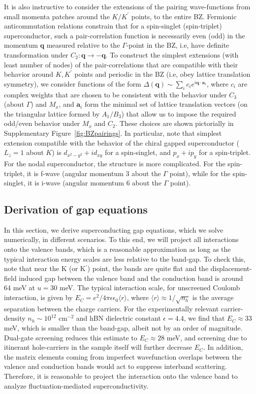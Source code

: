 \documentclass[aps,pra,twocolumn,superscriptaddress,10pt,article,nofootinbib,showpacs,longbibliography]{revtex4-1}
\def \q{{\mathbf q}}
\begin{document}
It is also instructive to consider the extensions of the pairing wave-functions from small momenta patches around the $K/K^\prime$ points, to the entire BZ.
Fermionic anticommutation relations constrain that for a spin-singlet (spin-triplet) superconductor, such a pair-correlation function is necessarily even (odd) in the momentum $\q$ measured relative to the $\Gamma$-point in the BZ, i.e, have definite transformation under $C_2: \q \to - \q$. 
To construct the simplest extensions (with least number of nodes) of the pair-correlations that are compatible with their behavior around $K,K^\prime$ points and periodic in the BZ (i.e, obey lattice translation symmetry), we consider functions of the form $\Delta(\q) \sim \sum_{i} c_i e^{i \q \cdot \mathbf{a}_i}$, where $c_i$ are complex weights that are chosen to be consistent with the behavior under $C_3$ (about $\Gamma$) and $M_x$, and $\mathbf{a}_i$ form the minimal set of lattice translation vectors (on the triangular lattice formed by $A_1/B_3$) that allow us to impose the required odd/even behavior under $M_x$ and $C_2$.
These choices are shown pictorially in Supplementary Figure~\ref{fig:BZpairings}.
In particular, note that simplest extension compatible with the behavior of the chiral gapped superconductor ($L_z = 1$ about $K$) is $d_{x^2 - y^2} + i d_{xy}$ for a spin-singlet, and $p_x + i p_y$ for a spin-triplet.
For the nodal superconductor, the structure is more complicated. 
For the spin-triplet, it is f-wave (angular momentum 3 about the $\Gamma $ point), while for the spin-singlet, it is i-wave (angular momentum 6 about the $\Gamma $ point).



\subsection{Derivation of gap equations}
In this section, we derive superconducting gap equations, which we solve numerically, in different scenarios.
To this end, we will project all interactions onto the valence bands, which is a reasonable approximation as long as the typical interaction energy scales are less relative to the band-gap.
To check this, note that near the K (or K$^\prime$) point, the bands are quite flat and the displacement-field induced gap between the valence band and the conduction band is around 64 meV at $u = 30$ meV. 
The typical interaction scale, for unscreened Coulomb interaction, is given by $E_C = e^2/ 4\pi \epsilon \epsilon_0 \langle r \rangle$, where $\langle r \rangle \approx 1/\sqrt{n_h}$ is the average separation between the charge carriers. 
For the experimentally relevant carrier-density $n_h \sim 10^{12} $ cm$^{-2}$ and hBN dielectric constant $\epsilon = 4.4$, we find that $E_C \approx 33$ meV, which is smaller than the band-gap, albeit not by an order of magnitude.
Dual-gate screening reduces this estimate to $E_C \approx 28$ meV, and screening due to itinerant hole-carriers in the sample itself will further decrease $E_C$. 
In addition, the matrix elements coming from imperfect wavefunction overlaps between the valence and conduction bands would act to suppress interband scattering.
Therefore, it is reasonable to project the interaction onto the valence band to analyze fluctuation-mediated superconductivity.
\end{document}
